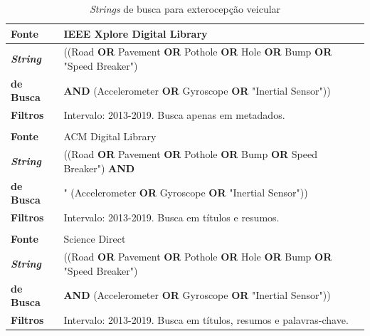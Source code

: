\begin{table}[h!]
    \caption{\textit{Strings} de busca para exterocepção veicular}
    \label{tabela:percepcao_ambiente_busca}
    \centering
    \small
    \begin{tabular}{l l}
        
        \toprule
        \textbf{Fonte} & IEEE Xplore Digital Library \\
        \midrule
        \textbf{\textit{String}} & ((Road \textbf{OR} Pavement \textbf{OR} Pothole \textbf{OR} Hole \textbf{OR} Bump \textbf{OR} "Speed Breaker") \\ \textbf{de Busca} &  \textbf{AND} (Accelerometer \textbf{OR} Gyroscope \textbf{OR} "Inertial Sensor")) \\
        \midrule
        \textbf{Filtros} & Intervalo: 2013-2019. Busca apenas em metadados. \\
        \bottomrule
        
        \\
        
        \toprule
        \textbf{Fonte} & ACM Digital Library \\
        \midrule
        \textbf{\textit{String}} & ((Road \textbf{OR} Pavement \textbf{OR} Pothole \textbf{OR} Bump \textbf{OR} Speed Breaker") \textbf{AND} \\ \textbf{de Busca} & " (Accelerometer \textbf{OR} Gyroscope \textbf{OR} "Inertial Sensor")) \\ 
        \midrule
        \textbf{Filtros} & Intervalo: 2013-2019. Busca em títulos e resumos. \\ 
        \bottomrule
        
        \\
        
        \toprule
        \textbf{Fonte} & Science Direct \\
        \midrule
        \textbf{\textit{String}} & ((Road \textbf{OR} Pavement \textbf{OR} Pothole \textbf{OR} Hole \textbf{OR} Bump \textbf{OR} "Speed Breaker") \\ \textbf{de Busca} &  \textbf{AND} (Accelerometer \textbf{OR} Gyroscope \textbf{OR} "Inertial Sensor")) \\ 
        \midrule
        \textbf{Filtros} & Intervalo: 2013-2019. Busca em títulos, resumos e palavras-chave. \\
        \bottomrule
    \end{tabular}
\end{table}

